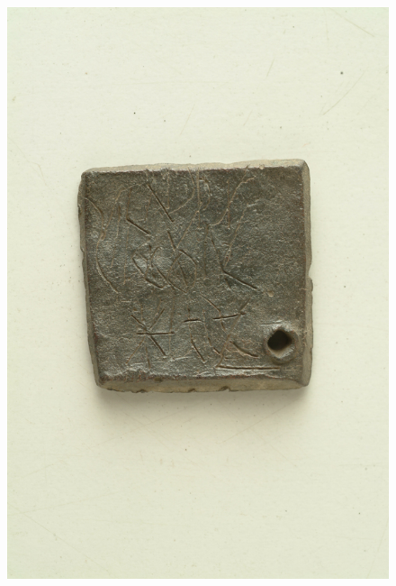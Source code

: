 \documentclass[amsthm,ebook]{saparticle}
\begin{document}
\begin{figure}[!h]
\centering
\includegraphics[scale=0.25]{EAGLE16lameetalteaching-img001.jpg}

\end{figure}
\end{document}
